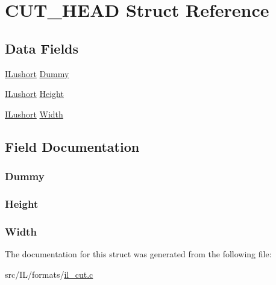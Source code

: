 \hypertarget{struct_c_u_t___h_e_a_d}{\section{C\-U\-T\-\_\-\-H\-E\-A\-D Struct Reference}
\label{struct_c_u_t___h_e_a_d}
}
\subsection*{Data Fields}
\begin{DoxyCompactItemize}
\item 
\hyperlink{il_8h_af6287b43748354a7c4864da43ae56962}{I\-Lushort} \hyperlink{struct_c_u_t___h_e_a_d_a59599d5367c6f076a0e05a7bfdb1e073}{Dummy}
\item 
\hyperlink{il_8h_af6287b43748354a7c4864da43ae56962}{I\-Lushort} \hyperlink{struct_c_u_t___h_e_a_d_ab74e2bb7cc7272180be796817440ae4e}{Height}
\item 
\hyperlink{il_8h_af6287b43748354a7c4864da43ae56962}{I\-Lushort} \hyperlink{struct_c_u_t___h_e_a_d_aed0f0a923b8346ba51a4de45fff77ee7}{Width}
\end{DoxyCompactItemize}


\subsection{Field Documentation}
\hypertarget{struct_c_u_t___h_e_a_d_a59599d5367c6f076a0e05a7bfdb1e073}{
\subsubsection[{Dummy}]{ Dummy}}\label{struct_c_u_t___h_e_a_d_a59599d5367c6f076a0e05a7bfdb1e073}
\hypertarget{struct_c_u_t___h_e_a_d_ab74e2bb7cc7272180be796817440ae4e}{
\subsubsection[{Height}]{ Height}}\label{struct_c_u_t___h_e_a_d_ab74e2bb7cc7272180be796817440ae4e}
\hypertarget{struct_c_u_t___h_e_a_d_aed0f0a923b8346ba51a4de45fff77ee7}{
\subsubsection[{Width}]{ Width}}\label{struct_c_u_t___h_e_a_d_aed0f0a923b8346ba51a4de45fff77ee7}


The documentation for this struct was generated from the following file\-:\begin{DoxyCompactItemize}
\item 
src/\-I\-L/formats/\hyperlink{il__cut_8c}{il\-\_\-cut.\-c}\end{DoxyCompactItemize}
